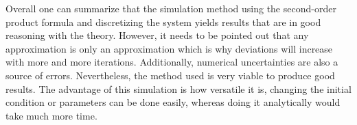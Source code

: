 Overall one can summarize that the simulation method using the second-order product formula and discretizing the system yields results that are in good reasoning with the theory. However, it needs to be pointed out that any approximation is only an approximation which is why deviations will increase with more and more iterations. Additionally, numerical uncertainties are also a source of errors. Nevertheless, the method used is very viable to produce good results. The advantage of this simulation is how versatile it is, changing the initial condition or parameters can be done easily, whereas doing it analytically would take much more time.


